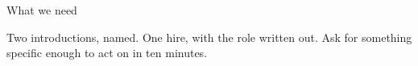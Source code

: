 \begin{frame}{What we need}
  \begin{glass}
  Two introductions, named. One hire, with the role written out. Ask for something specific
  enough to act on in ten minutes.
  \end{glass}
\end{frame}
